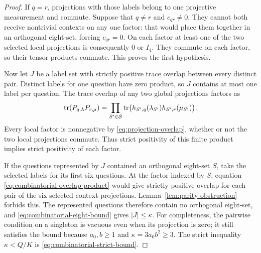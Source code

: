 \begin{proof}
If \(q=r\), projections with those labels belong to one projective
measurement and commute.  Suppose that \(q\ne r\) and \(c_{qr}\ne0\).
They cannot both receive nontrivial contexts on any one factor:
that would place them together in an orthogonal eight-set, forcing
\(c_{qr}=0\).  On each factor at least one of the two selected local
projections is consequently \(0\) or \(I_4\).  They commute on each
factor, so their tensor products commute.  This proves the first
hypothesis.

Now let \(J\) be a label set with strictly positive trace overlap
between every distinct pair.  Distinct labels for one question have
zero product, so \(J\) contains at most one label per question.  The
trace overlap of any two global projections factors as
\begin{equation}\label{eq:combinatorial-overlap-product}
 \operatorname{tr}(P_{q,\lambda}P_{r,\mu})
 =
 \prod_{S'\in\mathcal S}
 \operatorname{tr}\bigl(h_{S',q}(\lambda_{S'})
          h_{S',r}(\mu_{S'})\bigr).
\end{equation}
Every local factor is nonnegative by
\eqref{eq:projection-overlap}, whether or not the two local
projections commute.  Thus strict positivity of this finite product
implies strict positivity of each factor.

If the questions represented by \(J\) contained an orthogonal
eight-set \(S\), take the selected labels for its first six questions.
At the factor indexed by \(S\), equation
\eqref{eq:combinatorial-overlap-product} would give strictly positive
overlap for each pair of the six selected context projections.
Lemma~\ref{lem:parity-obstruction} forbids this.  The represented
questions therefore contain no orthogonal eight-set, and
\eqref{eq:combinatorial-eight-bound} gives \(|J|\leq\kappa\).
For completeness, the pairwise condition on a singleton is vacuous
even when its projection is zero; it still satisfies the bound
because \(a_0,b\geq1\) and \(\kappa=3a_0b^2\geq3\).  The strict inequality
\(\kappa<Q/K\) is \eqref{eq:combinatorial-strict-bound}.
\end{proof}

